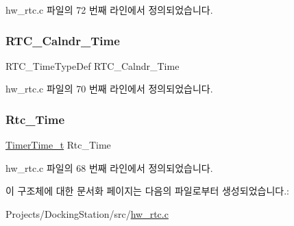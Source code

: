 hw\+\_\+rtc.\+c 파일의 72 번째 라인에서 정의되었습니다.

\mbox{\label{struct_rtc_timer_context__t_a605148ba4720b20b9ba2445a090a64d4}} 
\subsubsection{\texorpdfstring{R\+T\+C\+\_\+\+Calndr\+\_\+\+Time}{RTC\_Calndr\_Time}}
{\footnotesize\ttfamily R\+T\+C\+\_\+\+Time\+Type\+Def R\+T\+C\+\_\+\+Calndr\+\_\+\+Time}



hw\+\_\+rtc.\+c 파일의 70 번째 라인에서 정의되었습니다.

\mbox{\label{struct_rtc_timer_context__t_a05f48439ba05c77e6271805cff79760f}} 
\subsubsection{\texorpdfstring{Rtc\+\_\+\+Time}{Rtc\_Time}}
{\footnotesize\ttfamily \mbox{\hyperlink{utilities_8h_a4215ca43d3e953099ea758ce428599d0}{Timer\+Time\+\_\+t}} Rtc\+\_\+\+Time}



hw\+\_\+rtc.\+c 파일의 68 번째 라인에서 정의되었습니다.



이 구조체에 대한 문서화 페이지는 다음의 파일로부터 생성되었습니다.\+:\begin{DoxyCompactItemize}
\item 
Projects/\+Docking\+Station/src/\mbox{\hyperlink{hw__rtc_8c}{hw\+\_\+rtc.\+c}}\end{DoxyCompactItemize}
